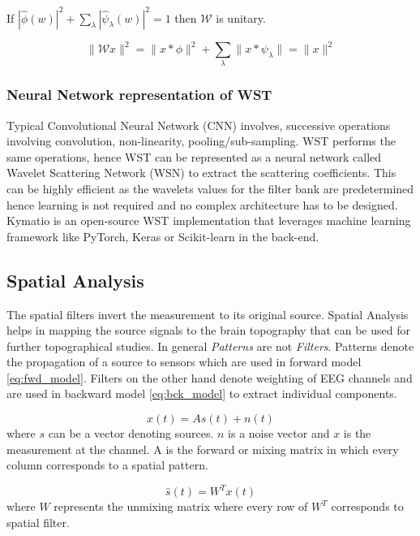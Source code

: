 If $|\hat{\phi}(w)|^2 + \sum_{\lambda} | \hat{\psi}_{\lambda}(w)|^2 = 1$ then $\mathcal{W}$ is unitary.

\begin{equation}    
    \|\mathcal{W}x\|^2 = \|x\ast\phi\|^2 + \sum_{\lambda}\| x \ast \psi_\lambda\| = \|x\|^2
\end{equation}

\subsubsection{Neural Network representation of WST}
 Typical Convolutional Neural Network (CNN)  involves, successive operations involving convolution, non-linearity, pooling/sub-sampling. WST performs the same operations, hence WST can be represented as a neural network called Wavelet Scattering Network (WSN)  to extract the scattering coefficients. This can be highly efficient as the wavelets values for the filter bank are predetermined hence learning is not required and no complex architecture has to be designed. Kymatio \cite{2020_kymatio}is an open-source WST implementation that leverages machine learning framework like PyTorch, Keras or Scikit-learn in the back-end.

\subsection{Spatial Analysis}
The spatial filters invert the measurement to its original source. Spatial Analysis helps in mapping the source signals to the brain topography that can be used for further topographical studies. In general \textit{Patterns} are not \textit{Filters}. Patterns denote the propagation of a source to sensors which are used in forward model \ref{eq:fwd_model}. Filters on the other hand denote weighting of EEG channels and are used in backward model \ref{eq:bck_model} to extract individual components.

\begin{equation} \label{eq:fwd_model}
    x(t) = A s(t) +n(t)
\end{equation}
where $s$ can be a vector denoting sources. $n$ is a noise vector and $x$ is the measurement at the channel. A is the forward or mixing matrix in which every column corresponds to a spatial pattern.

\begin{equation} \label{eq:bck_model}
    \hat{s}(t) = W^T x(t)
\end{equation}
where $W$ represents the unmixing matrix where every row of $W^T$ corresponds to spatial filter.

